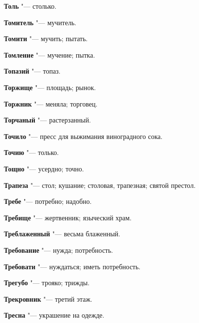 \begin{mymulticols}{2}
\noindent\textbf{Толь} "--- столько. 




\noindent\textbf{Томитель} "--- мучитель. 




\noindent\textbf{Томити} "--- мучить; пытать. 




\noindent\textbf{Томление} "--- мучение; пытка. 




\noindent\textbf{Топазий} "--- топаз. 




\noindent\textbf{Торжище} "--- площадь; рынок. 




\noindent\textbf{Торжник} "--- меняла; торговец. 




\noindent\textbf{Торчаный} "--- растерзанный. 




\noindent\textbf{Точило} "--- пресс для выжимания виноградного сока. 




\noindent\textbf{Точию} "--- только. 




\noindent\textbf{Тощно} "--- усердно; точно. 




\noindent\textbf{Трапеза} "--- стол; кушание; столовая, трапезная; святой престол. 




\noindent\textbf{Требе} "--- потребно; надобно. 




\noindent\textbf{Требище} "--- жертвенник; языческий храм. 




\noindent\textbf{Треблаженный} "--- весьма блаженный. 




\noindent\textbf{Требование} "--- нужда; потребность. 




\noindent\textbf{Требовати} "--- нуждаться; иметь потребность. 




\noindent\textbf{Трегубо} "--- трояко; трижды. 




\noindent\textbf{Трекровник} "--- третий этаж. 




\noindent\textbf{Тресна} "--- украшение на одежде. 





\end{mymulticols}

